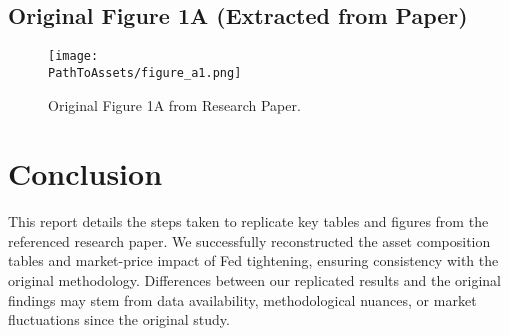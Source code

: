 \documentclass{article}
\begin{document}
\subsection{Original Figure 1A (Extracted from Paper)}
\begin{figure}[H]
    \centering
    \texttt{[image: \\PathToAssets/figure\_a1.png]}
    \caption{Original Figure 1A from Research Paper.}
\end{figure}


\section{Conclusion}
This report details the steps taken to replicate key tables and figures from the referenced research paper. We successfully reconstructed the asset composition tables and market-price impact of Fed tightening, ensuring consistency with the original methodology. Differences between our replicated results and the original findings may stem from data availability, methodological nuances, or market fluctuations since the original study.
\end{document}
